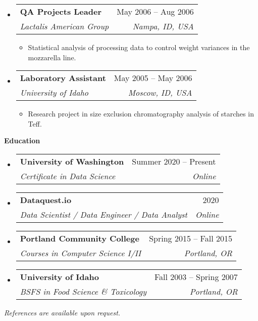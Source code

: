 \documentclass[letterpaper,12pt]{article}[leftmargin=*]
\makeatletter
\def \entryspacing {-0pt}
\newcommand{\education}[2]{\vspace{6pt}
  \colorbox{Copper}{\color{white}\raggedbottom\normalsize\textbf{{#1}{\hspace{9pt}#2\hspace{4pt}}}}
}
\newcommand{\resumeEntryStart}{\begin{itemize}[leftmargin=2.5mm]}
\newcommand{\resumeEntryEnd}{\end{itemize}\vspace{\entryspacing}}
\newcommand{\resumeItemListStart}{\begin{itemize}[leftmargin=4.5mm]}
\newcommand{\resumeItemListEnd}{\end{itemize}}
\newcommand{\resumeItem}[1]{
  \item\small{
    {#1 \vspace{-2pt}}
  }
}
\newcommand{\resumeEntryTSDL}[4]{
  \vspace{-1pt}\item[]
    \begin{tabularx}{0.97\textwidth}{X@{\hspace{60pt}}r}
      \textbf{\color{primary}#1} & {\firabook\color{accent}\small#2} \\
      \textit{\color{accent}\small#3} & \textit{\color{accent}\small#4} \\
    \end{tabularx}\vspace{-6pt}
}
\makeatother
\begin{document}
  \resumeEntryStart
    \resumeEntryTSDL
      {QA Projects Leader}{May 2006 -- Aug 2006}
      {Lactalis American Group}{Nampa, ID, USA}
    \resumeItemListStart
      \resumeItem {Statistical analysis of processing data to control weight variances in the mozzarella line.}
    \resumeItemListEnd
  \resumeEntryEnd
  
  \resumeEntryStart
    \resumeEntryTSDL
      {Laboratory Assistant}{May 2005 -- May 2006}
      {University of Idaho}{Moscow, ID, USA}
    \resumeItemListStart
      \resumeItem {Research project in size exclusion chromatography analysis of starches in Teff.}
    \resumeItemListEnd
  \resumeEntryEnd

\education{\faGraduationCap}{Education}

  \resumeEntryStart
    \resumeEntryTSDL
      {University of Washington}{Summer 2020 -- Present}
      {Certificate in Data Science}{Online}
    \resumeEntryTSDL
      {Dataquest.io}{2020}
      {Data Scientist / Data Engineer / Data Analyst}{Online}
    \resumeEntryTSDL
      {Portland Community College}{Spring 2015 -- Fall 2015}
      {Courses in Computer Science I/II}{Portland, OR}
    \resumeEntryTSDL
      {University of Idaho}{Fall 2003 -- Spring 2007}
      {BSFS in Food Science \& Toxicology}{Portland, OR}
    
  \resumeEntryEnd
  
  \bigskip 
  
  \begin{center}
    \color{accent}\small{\textit{References are available upon request.}}
  \end{center}
\end{document}
